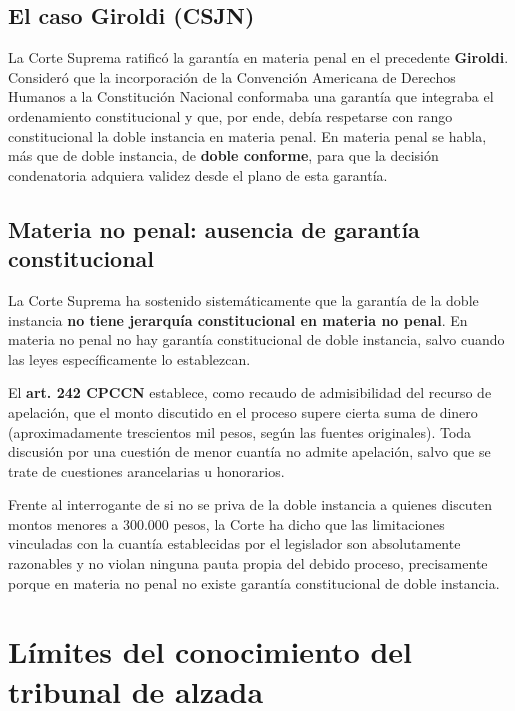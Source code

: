 \documentclass[12pt,oneside]{book}
\begin{document}
\subsection{El caso Giroldi (CSJN)}

La Corte Suprema ratificó la garantía en materia penal en el precedente \textbf{Giroldi}. Consideró que la incorporación de la Convención Americana de Derechos Humanos a la Constitución Nacional conformaba una garantía que integraba el ordenamiento constitucional y que, por ende, debía respetarse con rango constitucional la doble instancia en materia penal. En materia penal se habla, más que de doble instancia, de \textbf{doble conforme}, para que la decisión condenatoria adquiera validez desde el plano de esta garantía.

\subsection{Materia no penal: ausencia de garantía constitucional}

\begin{important}
La Corte Suprema ha sostenido sistemáticamente que la garantía de la doble instancia \textbf{no tiene jerarquía constitucional en materia no penal}. En materia no penal no hay garantía constitucional de doble instancia, salvo cuando las leyes específicamente lo establezcan.
\end{important}

El \textbf{art. 242 CPCCN} establece, como recaudo de admisibilidad del recurso de apelación, que el monto discutido en el proceso supere cierta suma de dinero (aproximadamente trescientos mil pesos, según las fuentes originales). Toda discusión por una cuestión de menor cuantía no admite apelación, salvo que se trate de cuestiones arancelarias u honorarios.

Frente al interrogante de si no se priva de la doble instancia a quienes discuten montos menores a 300.000 pesos, la Corte ha dicho que las limitaciones vinculadas con la cuantía establecidas por el legislador son absolutamente razonables y no violan ninguna pauta propia del debido proceso, precisamente porque en materia no penal no existe garantía constitucional de doble instancia.

\section{Límites del conocimiento del tribunal de alzada}
\end{document}
